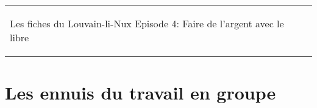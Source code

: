 



\begin{tabular}{p{13cm}r}
	\begin{center}{\Large Les fiches du Louvain-li-Nux\linebreak \linebreak
	\LARGE Episode 4: Faire de l'argent avec le libre}\end{center}
		&
	\usebox{\logollnux}
\end{tabular}


\section*{Les ennuis du travail en groupe}

                                                                                                                   

